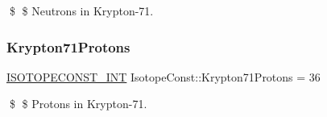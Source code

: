 \$ \$ Neutrons in Krypton-\/71. \mbox{\label{group___isotope_const-_krypton-_kr71_gaa31cc924513449f6746aff91ae1f207a}} 
\subsubsection{\texorpdfstring{Krypton71\+Protons}{Krypton71Protons}}
{\footnotesize\ttfamily \mbox{\hyperlink{group___isotope_const-_macros_ga5f18360b3e99483a35c32d789e62621c}{I\+S\+O\+T\+O\+P\+E\+C\+O\+N\+S\+T\+\_\+\+I\+NT}} Isotope\+Const\+::\+Krypton71\+Protons = 36}

\$ \$ Protons in Krypton-\/71. 
